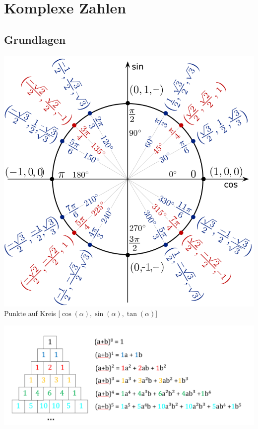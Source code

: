 \section{Komplexe Zahlen}
\subsection{Grundlagen}
\begin{center}
	\includegraphics[width=0.6\columnwidth]{Images/einheitskreis}\\
	Punkte auf Kreis [$\cos(\alpha), \sin(\alpha), \tan(\alpha)$]
\end{center}

\begin{center}
	\includegraphics[width=\columnwidth]{Images/pascaldreieck}\\
\end{center}

